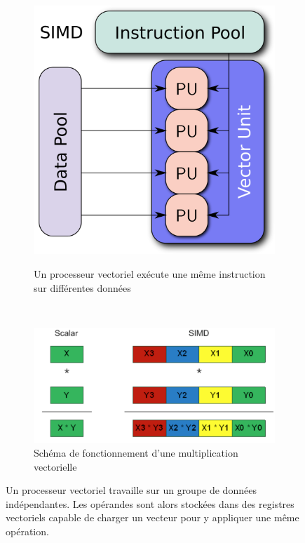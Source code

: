 \begin{figure}
    \begin{subfigure}[]{0.5\linewidth}\centering
        \vspace{1.6cm}
        \includegraphics[width=.5\linewidth]{images/cpu_simd.png}
        \label{pic_cpu_simd}
        \caption{Un processeur vectoriel exécute une même instruction sur différentes données}
    \end{subfigure}%
    ~ %
    \begin{subfigure}[]{0.5\linewidth}\centering
        \includegraphics[width=\linewidth]{images/Chapitre1/simd.png}
        \caption{Schéma de fonctionnement d'une multiplication vectorielle\protect\footnotemark}
        \label{pic_simd2}
    \end{subfigure}
   
    \caption{Un processeur vectoriel travaille sur un groupe de données indépendantes. Les opérandes sont alors stockées dans des registres vectoriels capable de charger un vecteur pour y appliquer une même opération.}
    \label{pic_simd}
\end{figure}



